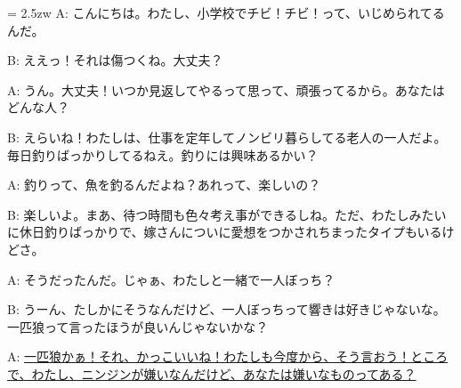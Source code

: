\documentclass[11pt]{amsart}
\title{}
\author{}
\newenvironment{hangall}[1]{\hangindent = 2.5zw\everypar{\hangindent = 2.5zw}}{}
\begin{document}
\maketitle
\begin{hangall}{}%
A: こんにちは。わたし、小学校でチビ！チビ！って、いじめられてるんだ。

B: ええっ！それは傷つくね。大丈夫？

A: うん。大丈夫！いつか見返してやるって思って、頑張ってるから。あなたはどんな人？

B: えらいね！わたしは、仕事を定年してノンビリ暮らしてる老人の一人だよ。毎日釣りばっかりしてるねえ。釣りには興味あるかい？

A: 釣りって、魚を釣るんだよね？あれって、楽しいの？

B: 楽しいよ。まあ、待つ時間も色々考え事ができるしね。ただ、わたしみたいに休日釣りばっかりで、嫁さんについに愛想をつかされちまったタイプもいるけどさ。

A: そうだったんだ。じゃぁ、わたしと一緒で一人ぼっち？

B: うーん、たしかにそうなんだけど、一人ぼっちって響きは好きじゃないな。一匹狼って言ったほうが良いんじゃないかな？

A: \ul{一匹狼かぁ！それ、かっこいいね！わたしも今度から、そう言おう！ところで、わたし、ニンジンが嫌いなんだけど、あなたは嫌いなものってある？}\end{hangall}
\end{document}
